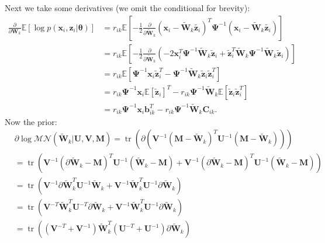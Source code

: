 \documentclass[a4paper,11pt]{article}
\DeclareMathOperator*{\tr}{tr}
\begin{document}
Next we take some derivatives (we omit the conditional for brevity):
\begin{align*}
    \frac{\partial}{\partial \mathbf{W}_k} \mathbb{E}
    \left[ \log p(\mathbf{x}_i, \mathbf{z}_i| \boldsymbol{\theta}) \right] &= 
    r_{ik} \mathbb{E} \left[
        -\frac12\frac{\partial}{\partial \tilde{\mathbf{W}}_k}
        (\mathbf{x}_i - \tilde{\mathbf{W}}_k \tilde{\mathbf{z}_i})^T
        \boldsymbol\Psi^{-1}
        (\mathbf{x}_i - \tilde{\mathbf{W}}_k \tilde{\mathbf{z}_i})
    \right] \\
    &= r_{ik} \mathbb{E} \left[
        -\frac12\frac{\partial}{\partial \tilde{\mathbf{W}}_k}\left(
            -2 \mathbf{x}_i^T\boldsymbol{\Psi}^{-1}\tilde{\mathbf{W}}_k\tilde{\mathbf{z}}_i
            + \tilde{\mathbf{z}}_i^T\tilde{\mathbf{W}}_k\boldsymbol{\Psi}^{-1}
            \tilde{\mathbf{W}}_k\tilde{\mathbf{z}}_i
        \right)
    \right] \\
    &= r_{ik} \mathbb{E} \left[
            \boldsymbol{\Psi}^{-1}\mathbf{x}_i\tilde{\mathbf{z}}_i^T
            - \boldsymbol{\Psi}^{-1}
            \tilde{\mathbf{W}}_k\tilde{\mathbf{z}}_i\tilde{\mathbf{z}}_i^T
    \right] \\
    &= r_{ik} \boldsymbol{\Psi}^{-1}\mathbf{x}_i
        \mathbb{E}\left[\tilde{\mathbf{z}}_i\right]^T
        - r_{ik}\boldsymbol{\Psi}^{-1} \tilde{\mathbf{W}}_k
        \mathbb{E}\left[\tilde{\mathbf{z}}_i\tilde{\mathbf{z}}_i^T\right] \\ 
    &= r_{ik} \boldsymbol{\Psi}^{-1}\mathbf{x}_i
    \mathbf{b}_{ik}^T
    - r_{ik}\boldsymbol{\Psi}^{-1} \tilde{\mathbf{W}}_k
    \mathbf{C}_{ik}.
\end{align*}
Now the prior:
\begin{align*}
    &\partial \log \mathcal{MN}(\tilde{\mathbf{W}}_k
    | \mathbf{U}, \mathbf{V}, \mathbf{M})
    = \tr\left(
        \partial\left(
            \mathbf{V}^{-1}(\mathbf{M} - \tilde{\mathbf{W}}_k)^T \mathbf{U}^{-1}
            (\mathbf{M} - \tilde{\mathbf{W}}_k)
        \right)
    \right) \\
    &= \tr\left(
        \mathbf{V}^{-1}(\partial\tilde{\mathbf{W}}_k - \mathbf{M})^T \mathbf{U}^{-1}
        (\tilde{\mathbf{W}}_k - \mathbf{M}) +
        \mathbf{V}^{-1}(\partial\tilde{\mathbf{W}}_k - \mathbf{M})^T \mathbf{U}^{-1}
        (\tilde{\mathbf{W}}_k - \mathbf{M})
    \right) \\
    &= \tr\left(
        \mathbf{V}^{-1}\partial\tilde{\mathbf{W}}_k^T \mathbf{U}^{-1}
        \tilde{\mathbf{W}}_k +
        \mathbf{V}^{-1}\tilde{\mathbf{W}}_k^T \mathbf{U}^{-1}
        \partial\tilde{\mathbf{W}}_k
    \right) \\
    &= \tr\left(
        \mathbf{V}^{-T}\tilde{\mathbf{W}}_k^T \mathbf{U}^{-T}
        \partial\tilde{\mathbf{W}}_k +
        \mathbf{V}^{-1}\tilde{\mathbf{W}}_k^T \mathbf{U}^{-1}
        \partial\tilde{\mathbf{W}}_k
    \right) \\
    &= \tr\left(
        \left(
            \mathbf{V}^{-T} + \mathbf{V}^{-1}
        \right)
        \tilde{\mathbf{W}}_k^T
        \left(
            \mathbf{U}^{-T} + \mathbf{U}^{-1}
        \right)
        \partial \tilde{\mathbf{W}}_k
    \right)
\end{align*}
\end{document}

